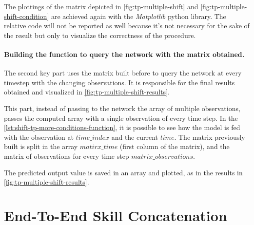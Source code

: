 The plottings of the matrix depicted in \cref{fig:tp-multiple-shift} and \cref{fig:tp-multiple-shift-condition} are achieved again with the \emph{Matplotlib} python library. The relative code will not be reported as well because it's not necessary for the sake of the result but only to visualize the correctness of the procedure.


\paragraph{Building the function to query the network with the matrix obtained. }
The second key part uses the matrix built before to query the network at every timestep with the changing observations. It is responsible for the final results obtained and visualized in \cref{fig:tp-multiple-shift-results}.

This part, instead of passing to the network the array of multiple observations, passes the computed array with a single observation of every time step. In the \cref{lst:shift-tp-more-conditions-function}, it is possible to see how the model is fed with the observation at $time\_index$ and the current $time$. The matrix previously built is split in the array $matirx\_time$  (first column of the matrix), and the matrix of observations for every time step $matrix\_observations$.



The predicted output value is saved in an array and plotted, as in the results in \cref{fig:tp-multiple-shift-results}.

\newpage
\section{End-To-End Skill Concatenation}

